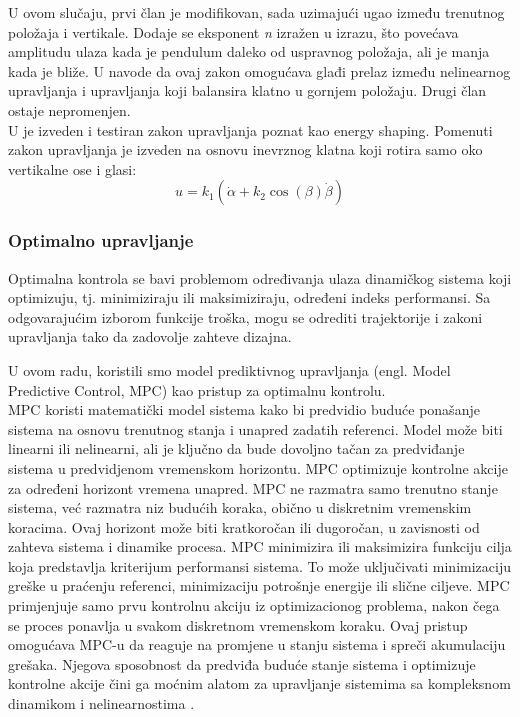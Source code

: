 \documentclass[a4paper,11pt]{article}
\theoremstyle{definition} \newtheorem{deff}{Definicija}[section]
\theoremstyle{definition} \newtheorem{prim}[deff]{Primer}
\theoremstyle{plain} \newtheorem{teor}[deff]{Teorema}
\begin{document}
	U ovom slučaju, prvi član je modifikovan, sada uzimajući ugao između trenutnog položaja i vertikale.
	Dodaje se eksponent \textit{n} izražen u izrazu, što povećava amplitudu ulaza kada je pendulum daleko od uspravnog položaja, ali je manja kada je bliže. U \cite{inicijalna} navode da ovaj zakon omogućava glađi prelaz između nelinearnog upravljanja i upravljanja koji balansira klatno u gornjem položaju. Drugi član ostaje nepromenjen. \\
	
	U \cite{ener_shaping} je izveden i testiran zakon upravljanja poznat kao energy shaping. Pomenuti zakon upravljanja je izveden na osnovu inevrznog klatna koji rotira samo oko vertikalne ose i glasi: \\
	
	\begin{equation}
		u = k_1 (\dot\alpha + k_2 \cos(\beta) \dot\beta)	
	\end{equation}
	
	\subsubsection{Optimalno upravljanje}
	Optimalna kontrola se bavi problemom određivanja ulaza dinamičkog sistema koji optimizuju, tj. minimiziraju ili maksimiziraju, određeni indeks performansi. Sa odgovarajućim izborom funkcije troška, mogu se odrediti trajektorije i zakoni upravljanja tako da zadovolje zahteve dizajna.
	
	U ovom radu, koristili smo model prediktivnog upravljanja (engl. Model Predictive Control, MPC) kao pristup za optimalnu kontrolu. \\
	
	MPC koristi matematički model sistema kako bi predvidio buduće ponašanje sistema na osnovu trenutnog stanja i unapred zadatih referenci. Model može biti linearni ili nelinearni, ali je ključno da bude dovoljno tačan za predviđanje sistema u predvidjenom vremenskom horizontu. MPC optimizuje kontrolne akcije za određeni horizont vremena unapred. MPC ne razmatra samo trenutno stanje sistema, već razmatra niz budućih koraka, obično u diskretnim vremenskim koracima. Ovaj horizont može biti kratkoročan ili dugoročan, u zavisnosti od zahteva sistema i dinamike procesa. MPC minimizira ili maksimizira funkciju cilja koja predstavlja kriterijum performansi sistema. To može uključivati minimizaciju greške u praćenju referenci, minimizaciju potrošnje energije ili slične ciljeve. MPC primjenjuje samo prvu kontrolnu akciju iz optimizacionog problema, nakon čega se proces ponavlja u svakom diskretnom vremenskom koraku. Ovaj pristup omogućava MPC-u da reaguje na promjene u stanju sistema i spreči akumulaciju grešaka. Njegova sposobnost da predviđa buduće stanje sistema i optimizuje kontrolne akcije čini ga moćnim alatom za upravljanje sistemima sa kompleksnom dinamikom i nelinearnostima \cite{mpc}.\\
	
\end{document}
